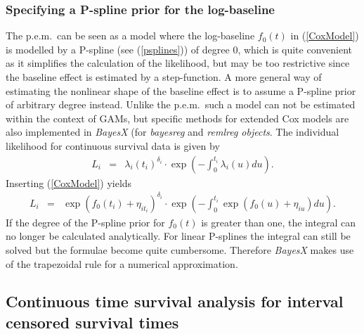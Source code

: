 \documentclass[11pt,a4paper,twoside]{bayesxarticle}
\begin{document}
\subsubsection{Specifying a P-spline prior for the log-baseline}

The p.e.m.~can be seen as a model where the log-baseline $f_0(t)$ in
(\ref{CoxModel}) is modelled by a P-spline (see (\ref{psplines})) of
degree 0, which is quite convenient as it simplifies the calculation
of the likelihood, but may be too restrictive since the baseline
effect is estimated by a step-function. A more general way of
estimating the nonlinear shape of the baseline effect is to assume a
P-spline prior of arbitrary degree instead. Unlike the p.e.m.~such a
model can not be estimated within the context of GAMs, but specific
methods for extended Cox models are also implemented in {\it BayesX}
(for {\it bayesreg} and {\it remlreg objects}. The individual
likelihood for continuous survival data is given by
\begin{eqnarray}\nonumber
L_i &=&\lambda_i(t_i)^{\delta_i}\cdot
\exp\left(-\int_{0}^{t_i}\lambda_i(u)du\right).
\end{eqnarray}
Inserting (\ref{CoxModel}) yields
\begin{eqnarray}\nonumber
L_i &=&\exp(f_0(t_i)+\eta_{i t_i})^{\delta_i}\cdot
\exp\left(-\int_{0}^{t_i}\exp(f_0(u)+\eta_{iu})du\right).
\end{eqnarray}
If the degree of the P-spline prior for $f_0(t)$ is greater than
one, the integral can no longer be calculated analytically. For
linear P-splines the integral can still be solved but the formulae
become quite cumbersome. Therefore {\it BayesX} makes use of the
trapezoidal rule for a numerical approximation.

\subsection{Continuous time survival analysis for interval censored survival times}
\label{intervalcensoring}
\end{document}
